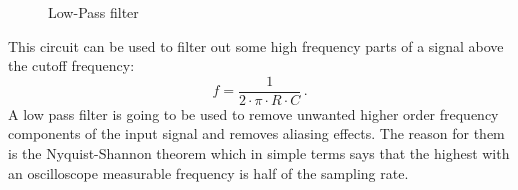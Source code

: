 \begin{figure}[htb]
	\centering
	\caption{Low-Pass filter}
	\label{fig_lowpass}
\end{figure}

This circuit can be used to filter out some high frequency parts of a signal above the cutoff frequency:
\[
f = \frac{1}{2 \cdot \pi \cdot R \cdot C}\,.
\]
A low pass filter is going to be used to remove unwanted higher order frequency components of the input signal and removes aliasing effects. The reason for them is the Nyquist-Shannon theorem which in simple terms says that the highest with an oscilloscope measurable frequency is half of the sampling rate.
